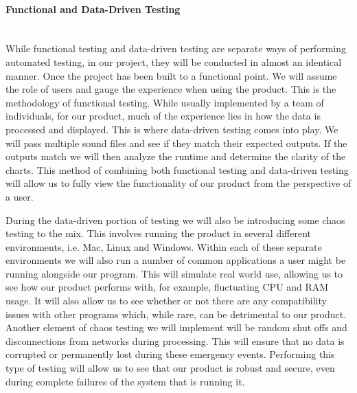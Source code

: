\paragraph{Functional and Data-Driven Testing} \mbox{}\\[\paragraphheaderspace]
While functional testing and data-driven testing are separate ways of performing automated testing, in our project, they will be conducted in almost an identical manner. Once the project has been built to a functional point. We will assume the role of users and gauge the experience when using the product. This is the methodology of functional testing. While usually implemented by a team of individuals, for our product, much of the experience lies in how the data is processed and displayed. This is where data-driven testing comes into play. We will pass multiple sound files and see if they match their expected outputs. If the outputs match we will then analyze the runtime and determine the clarity of the charts. This method of combining both functional testing and data-driven testing will allow us to fully view the functionality of our product from the perspective of a user.\par
During the data-driven portion of testing we will also be introducing some chaos testing to the mix. This involves running the product in several different environments, i.e. Mac, Linux and Windows. Within each of these separate environments we will also run a number of common applications a user might be running alongside our program. This will simulate real world use, allowing us to see how our product performs with, for example, fluctuating CPU and RAM usage. It will also allow us to see whether or not there are any compatibility issues with other programs which, while rare, can be detrimental to our product. Another element of chaos testing we will implement will be random shut offs and disconnections from networks during processing. This will ensure that no data is corrupted or permanently lost during these emergency events. Performing this type of testing will allow us to see that our product is robust and secure, even during complete failures of the system that is running it.

